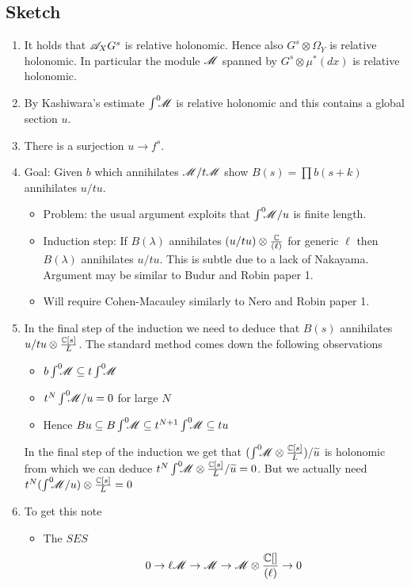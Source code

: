 \subsection{Sketch}
\begin{enumerate}
  \item It holds that $\mathscr{A}_X G^s$ is relative holonomic. Hence also $G^s \otimes \Omega_Y$ is relative holonomic. In particular the module $\mathscr{M}$ spanned by $G^s \otimes \mu^*(dx)$ is relative holonomic.
  \item By Kashiwara's estimate $\int^0 \mkern -8mu \mathscr{M}$ is relative holonomic and this contains a global section $u$.
  \item There is a surjection $u\to f^s$.
  \item Goal: Given $b$ which annihilates $\mathscr{M}/t\mathscr{M}$ show $B(s) = \prod b(s + k)$ annihilates $u/tu$.
  \begin{itemize}
    \item Problem: the usual argument exploits that $\int^0 \mkern -8mu \mathscr{M} /u$ is finite length.
    \item Induction step: If $B(\lambda)$ annihilates $(u/tu)\otimes \frac{\mathbb{C}}{(\ell)}$ for generic $\ell$ then $B(\lambda)$ annihilates $u/tu$. This is subtle due to a lack of Nakayama. Argument may be similar to Budur and Robin paper 1.
    \item Will require Cohen-Macauley similarly to Nero and Robin paper 1.
  \end{itemize}
  \item In the final step of the induction we need to deduce that $B(s)$ annihilates $u/tu \otimes \frac{\mathbb{C}[s]}{L}$. The standard method comes down the following observations
  \begin{itemize}
    \item $b \int^0 \mkern -8mu \mathscr{M} \subseteq t\int^0 \mkern -8mu\mathscr{M}$
    \item $t^N\int^0 \mkern -8mu\mathscr{M} / u = 0$ for large $N$
    \item Hence $Bu \subseteq B\int^0 \mkern -8mu\mathscr{M} \subseteq t^{N+1}\int^0 \mkern -8mu \mathscr{M} \subseteq tu$
  \end{itemize}
  In the final step of the induction we get that $(\int^0 \mkern -8mu\mathscr{M} \otimes \frac{\mathbb{C}[s]}{L}) / \widetilde{u}$ is holonomic from which we can deduce $t^N \int^0 \mkern -8mu \mathscr{M} \otimes \frac{\mathbb{C}[s]}{L} / \widetilde{u} = 0$. But we actually need $t^N (\int^0 \mkern -8mu\mathscr{M}/ u) \otimes \frac{\mathbb{C}[s]}{L} = 0$
  \item To get this note
  \begin{itemize}
    \item The $SES$
    $$ 0 \to \ell \mathscr{M} \to \mathscr{M} \to \mathscr{M} \otimes \frac{\mathbb{C}[]}{(\ell)} \to 0$$

\end{itemize}
\end{enumerate}
